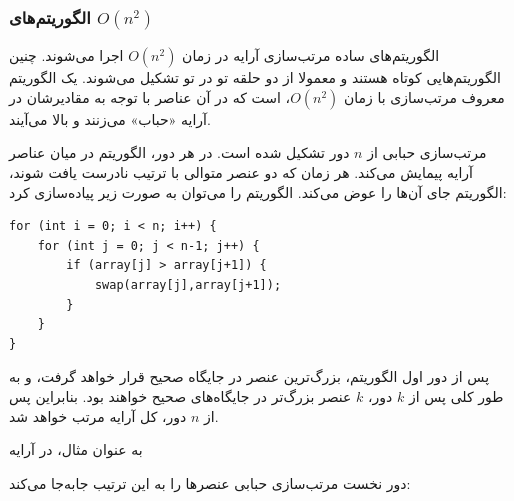 \subsubsection{الگوریتم‌های $O(n^2)$}


الگوریتم‌های ساده مرتب‌سازی آرایه
در زمان $O(n^2)$ اجرا می‌شوند.
چنین الگوریتم‌هایی کوتاه هستند و معمولا
از دو حلقه تو در تو تشکیل می‌شوند.
یک الگوریتم معروف مرتب‌سازی با زمان $O(n^2)$،
 است که در آن عناصر
با توجه به مقادیرشان در آرایه «حباب» می‌زنند و بالا می‌آیند.

مرتب‌سازی حبابی از $n$ دور تشکیل شده است.
در هر دور، الگوریتم در میان عناصر آرایه پیمایش می‌کند.
هر زمان که دو عنصر متوالی با ترتیب نادرست یافت شوند،
الگوریتم جای آن‌ها را عوض می‌کند.
الگوریتم را می‌توان به صورت زیر پیاده‌سازی کرد:
\begin{lstlisting}
for (int i = 0; i < n; i++) {
    for (int j = 0; j < n-1; j++) {
        if (array[j] > array[j+1]) {
            swap(array[j],array[j+1]);
        }
    }
}
\end{lstlisting}

پس از دور اول الگوریتم،
بزرگ‌ترین عنصر در جایگاه صحیح قرار خواهد گرفت،
و به طور کلی پس از $k$ دور، $k$ عنصر بزرگ‌تر
در جایگاه‌های صحیح خواهند بود.
بنابراین پس از $n$ دور، کل آرایه مرتب خواهد شد.

به عنوان مثال، در آرایه

\begin{center}
\end{center}

\noindent
دور نخست مرتب‌سازی حبابی عنصرها را به این ترتیب جابه‌جا می‌کند:

\begin{center}
\end{center}

